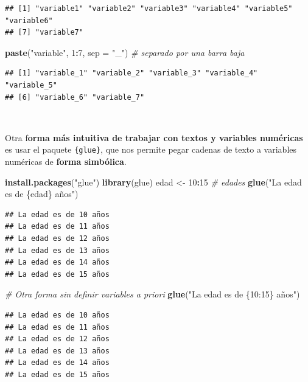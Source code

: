 \documentclass[11pt,]{book}
\newenvironment{Shaded}{\begin{snugshade}}{\end{snugshade}}
\newcommand{\CommentTok}[1]{\textcolor[rgb]{0.37,0.37,0.37}{\textit{#1}}}
\newcommand{\DataTypeTok}[1]{\textcolor[rgb]{0.27,0.27,0.27}{#1}}
\newcommand{\DecValTok}[1]{\textcolor[rgb]{0.06,0.06,0.06}{#1}}
\newcommand{\KeywordTok}[1]{\textcolor[rgb]{0.27,0.27,0.27}{\textbf{#1}}}
\newcommand{\NormalTok}[1]{#1}
\newcommand{\OperatorTok}[1]{\textcolor[rgb]{0.43,0.43,0.43}{\textbf{#1}}}
\newcommand{\StringTok}[1]{\textcolor[rgb]{0.5,0.5,0.5}{#1}}
\begin{document}
\begin{verbatim}
## [1] "variable1" "variable2" "variable3" "variable4" "variable5" "variable6"
## [7] "variable7"
\end{verbatim}

\begin{Shaded}
\begin{Highlighting}[]
\KeywordTok{paste}\NormalTok{(}\StringTok{"variable"}\NormalTok{, }\DecValTok{1}\OperatorTok{:}\DecValTok{7}\NormalTok{, }\DataTypeTok{sep =} \StringTok{"_"}\NormalTok{) }\CommentTok{# separado por una barra baja}
\end{Highlighting}
\end{Shaded}

\begin{verbatim}
## [1] "variable_1" "variable_2" "variable_3" "variable_4" "variable_5"
## [6] "variable_6" "variable_7"
\end{verbatim}

~

Otra f\textbf{orma más intuitiva de trabajar con textos y variables numéricas} es usar el paquete \texttt{\{glue\}}, que nos permite pegar cadenas de texto a variables numéricas de \textbf{forma simbólica}.

\begin{Shaded}
\begin{Highlighting}[]
\KeywordTok{install.packages}\NormalTok{(}\StringTok{"glue"}\NormalTok{)}
\KeywordTok{library}\NormalTok{(glue)}
\NormalTok{edad <-}\StringTok{ }\DecValTok{10}\OperatorTok{:}\DecValTok{15} \CommentTok{# edades}
\KeywordTok{glue}\NormalTok{(}\StringTok{"La edad es de \{edad\} años"}\NormalTok{)}
\end{Highlighting}
\end{Shaded}

\begin{verbatim}
## La edad es de 10 años
## La edad es de 11 años
## La edad es de 12 años
## La edad es de 13 años
## La edad es de 14 años
## La edad es de 15 años
\end{verbatim}

\begin{Shaded}
\begin{Highlighting}[]
\CommentTok{# Otra forma sin definir variables a priori}
\KeywordTok{glue}\NormalTok{(}\StringTok{"La edad es de \{10:15\} años"}\NormalTok{)}
\end{Highlighting}
\end{Shaded}

\begin{verbatim}
## La edad es de 10 años
## La edad es de 11 años
## La edad es de 12 años
## La edad es de 13 años
## La edad es de 14 años
## La edad es de 15 años
\end{verbatim}
\end{document}
